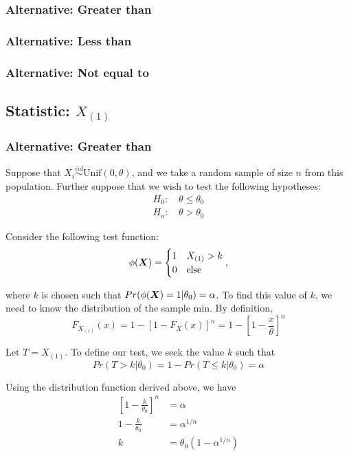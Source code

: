\documentclass[]{article}
\newcommand{\bfX}{\mbox{\boldmath $X$}}
\begin{document}
\subsubsection{Alternative: Greater than}

\subsubsection{Alternative: Less than}

\subsubsection{Alternative: Not equal to}

\subsection{Statistic: $X_{(1)}$}

\subsubsection{Alternative: Greater than}

Suppose that $X_i \stackrel{iid}{\sim} \text{Unif}(0, \theta)$, and we take a random sample of size $n$ from this population. Further suppose that we wish to test the following hypotheses:
\[
\begin{split}
\text{$H_0$: }& \theta \leq \theta_0 \\
\text{$H_a$: }& \theta > \theta_0
\end{split}
\]

Consider the following test function:
\[
\phi(\bfX) = \begin{cases}
1 & X_{(1)} > k \\
0 & \text{else}
\end{cases},
\]

where $k$ is chosen such that $Pr(\phi(\bfX) = 1|\theta_0) = \alpha$. To find this value of $k$, we need to know the distribution of the sample min. By definition, 
\[
F_{X_{(1)}}(x) = 1 - \left[1 - F_X(x)\right]^n = 1 - \left[1 - \frac{x}{\theta}\right]^n
\]

Let $T = X_{(1)}$. To define our test, we seek the value $k$ such that 
\[
Pr(T > k | \theta_0) = 1 - Pr(T \leq k | \theta_0) = \alpha
\]

Using the distribution function derived above, we have
\[
\begin{split}
\left[1 - \frac{k}{\theta_0}\right]^n &= \alpha \\
1 - \frac{k}{\theta_0} &= \alpha^{1/n} \\
k &= \theta_0(1 - \alpha^{1/n})
\end{split}
\]
\end{document}
